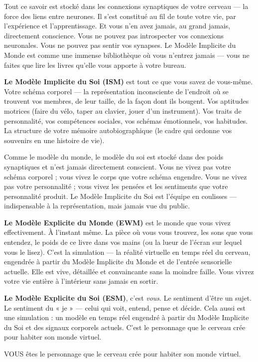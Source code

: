 \documentclass[11pt, twoside, openright]{book}
\begin{document}
Tout ce savoir est stocké dans les connexions synaptiques de votre cerveau --- la force des liens entre neurones. Il s'est constitué au fil de toute votre vie, par l'expérience et l'apprentissage. Et vous n'en avez jamais, au grand jamais, directement conscience. Vous ne pouvez pas introspecter vos connexions neuronales. Vous ne pouvez pas sentir vos synapses. Le Modèle Implicite du Monde est comme une immense bibliothèque où vous n'entrez jamais --- vous ne faites que lire les livres qu'elle vous apporte à votre bureau.

\textbf{Le Modèle Implicite du Soi (ISM)} est tout ce que vous savez de vous-même. Votre schéma corporel --- la représentation inconsciente de l'endroit où se trouvent vos membres, de leur taille, de la façon dont ils bougent. Vos aptitudes motrices (faire du vélo, taper au clavier, jouer d'un instrument). Vos traits de personnalité, vos compétences sociales, vos schémas émotionnels, vos habitudes. La structure de votre mémoire autobiographique (le cadre qui ordonne vos souvenirs en une histoire de vie).

Comme le modèle du monde, le modèle du soi est stocké dans des poids synaptiques et n'est jamais directement conscient. Vous ne vivez pas votre schéma corporel ; vous vivez le corps que votre schéma engendre. Vous ne vivez pas votre personnalité ; vous vivez les pensées et les sentiments que votre personnalité produit. Le Modèle Implicite du Soi est l'équipe en coulisses --- indispensable à la représentation, mais jamais vue du public.

\textbf{Le Modèle Explicite du Monde (EWM)} est le monde que vous vivez effectivement. À l'instant même. La pièce où vous vous trouvez, les sons que vous entendez, le poids de ce livre dans vos mains (ou la lueur de l'écran sur lequel vous le lisez). C'est la simulation --- la réalité virtuelle en temps réel du cerveau, engendrée à partir du Modèle Implicite du Monde et de l'entrée sensorielle actuelle. Elle est vive, détaillée et convaincante sans la moindre faille. Vous vivrez votre vie entière à l'intérieur sans jamais en sortir.

\textbf{Le Modèle Explicite du Soi (ESM)}, c'est \textit{vous}. Le sentiment d'être un sujet. Le sentiment du « je » --- celui qui voit, entend, pense et décide. Cela aussi est une simulation : un modèle en temps réel engendré à partir du Modèle Implicite du Soi et des signaux corporels actuels. C'est le personnage que le cerveau crée pour habiter son monde virtuel.

VOUS êtes le personnage que le cerveau crée pour habiter son monde virtuel.
\end{document}
